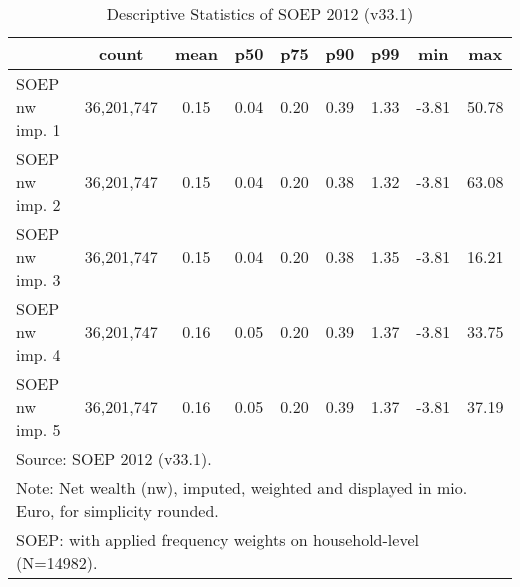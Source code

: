 \begin{table}[htbp]\centering
\def\sym#1{\ifmmode^{#1}\else\(^{#1}\)\fi}
\caption{Descriptive Statistics of SOEP 2012 (v33.1)}
\begin{tabular}{l*{1}{cccccccc}}
\hline\hline
                                            &       count&        mean&         p50&         p75&         p90&         p99&         min&         max\\
\hline
SOEP nw imp. 1                              &  36,201,747&        0.15&        0.04&        0.20&        0.39&        1.33&       -3.81&       50.78\\
SOEP nw imp. 2                              &  36,201,747&        0.15&        0.04&        0.20&        0.38&        1.32&       -3.81&       63.08\\
SOEP nw imp. 3                              &  36,201,747&        0.15&        0.04&        0.20&        0.38&        1.35&       -3.81&       16.21\\
SOEP nw imp. 4                              &  36,201,747&        0.16&        0.05&        0.20&        0.39&        1.37&       -3.81&       33.75\\
SOEP nw imp. 5                              &  36,201,747&        0.16&        0.05&        0.20&        0.39&        1.37&       -3.81&       37.19\\
\hline\hline
\multicolumn{9}{l}{\footnotesize Source: SOEP 2012 (v33.1).}\\
\multicolumn{9}{l}{\footnotesize Note: Net wealth (nw), imputed, weighted and displayed in mio. Euro, for simplicity rounded.}\\
\multicolumn{9}{l}{\footnotesize SOEP: with applied frequency weights on household-level (N=14982).}\\
\end{tabular}
\end{table}
